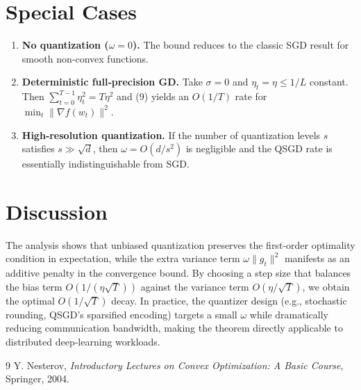 \documentclass[11pt]{article}
\begin{document}
\section*{Special Cases}
\begin{enumerate}[label=\alph*.]
\item \textbf{No quantization ($\omega=0$).}  The bound reduces to the classic SGD result for smooth non‑convex functions.
\item \textbf{Deterministic full‑precision GD.}  Take $\sigma=0$ and $\eta_t=\eta\le 1/L$ constant.  Then $\sum_{t=0}^{T-1}\eta_t^{2}=T\eta^{2}$ and (9) yields an $O(1/T)$ rate for $\min_t\|\nabla f(w_t)\|^{2}$.
\item \textbf{High‑resolution quantization.}  If the number of quantization levels $s$ satisfies $s\gg\sqrt{d}$, then $\omega=O(d/s^{2})$ is negligible and the QSGD rate is essentially indistinguishable from SGD.
\end{enumerate}

\section*{Discussion}
The analysis shows that unbiased quantization preserves the first‑order optimality condition in expectation, while the extra variance term $\omega\|g_t\|^{2}$ manifests as an additive penalty in the convergence bound.  By choosing a step size that balances the bias term $O(1/(\eta\sqrt{T}))$ against the variance term $O(\eta/\sqrt{T})$, we obtain the optimal $O(1/\sqrt{T})$ decay.  In practice, the quantizer design (e.g., stochastic rounding, QSGD’s sparsified encoding) targets a small $\omega$ while dramatically reducing communication bandwidth, making the theorem directly applicable to distributed deep‑learning workloads.


\begin{thebibliography}{9}
Y. Nesterov,
\textit{Introductory Lectures on Convex Optimization: A Basic Course},
Springer, 2004.
\end{thebibliography}
\end{document}
